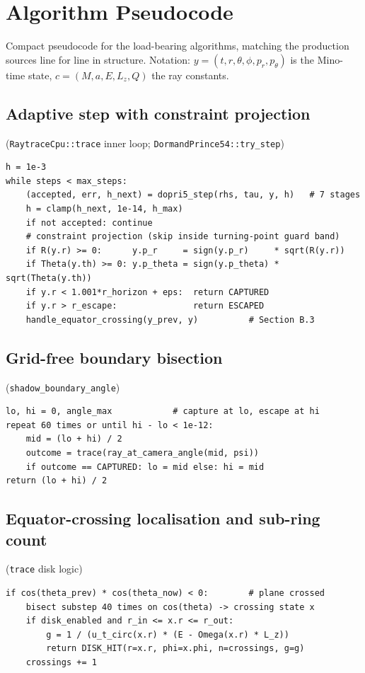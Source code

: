 \chapter{Algorithm Pseudocode}
\label{app:pseudocode}

Compact pseudocode for the load-bearing algorithms, matching the
production sources line for line in structure. Notation:
$y = (t, r, \theta, \phi, p_r, p_\theta)$ is the Mino-time state,
$c = (M, a, E, L_z, Q)$ the ray constants.

\section{Adaptive step with constraint projection}
(\texttt{RaytraceCpu::trace} inner loop;
\texttt{DormandPrince54::try\_step})

\begin{verbatim}
h = 1e-3
while steps < max_steps:
    (accepted, err, h_next) = dopri5_step(rhs, tau, y, h)   # 7 stages
    h = clamp(h_next, 1e-14, h_max)
    if not accepted: continue
    # constraint projection (skip inside turning-point guard band)
    if R(y.r) >= 0:      y.p_r     = sign(y.p_r)     * sqrt(R(y.r))
    if Theta(y.th) >= 0: y.p_theta = sign(y.p_theta) * sqrt(Theta(y.th))
    if y.r < 1.001*r_horizon + eps:  return CAPTURED
    if y.r > r_escape:               return ESCAPED
    handle_equator_crossing(y_prev, y)          # Section B.3
\end{verbatim}

\section{Grid-free boundary bisection}
(\texttt{shadow\_boundary\_angle})

\begin{verbatim}
lo, hi = 0, angle_max            # capture at lo, escape at hi
repeat 60 times or until hi - lo < 1e-12:
    mid = (lo + hi) / 2
    outcome = trace(ray_at_camera_angle(mid, psi))
    if outcome == CAPTURED: lo = mid else: hi = mid
return (lo + hi) / 2
\end{verbatim}

\section{Equator-crossing localisation and sub-ring count}
(\texttt{trace} disk logic)

\begin{verbatim}
if cos(theta_prev) * cos(theta_now) < 0:        # plane crossed
    bisect substep 40 times on cos(theta) -> crossing state x
    if disk_enabled and r_in <= x.r <= r_out:
        g = 1 / (u_t_circ(x.r) * (E - Omega(x.r) * L_z))
        return DISK_HIT(r=x.r, phi=x.phi, n=crossings, g=g)
    crossings += 1
\end{verbatim}

